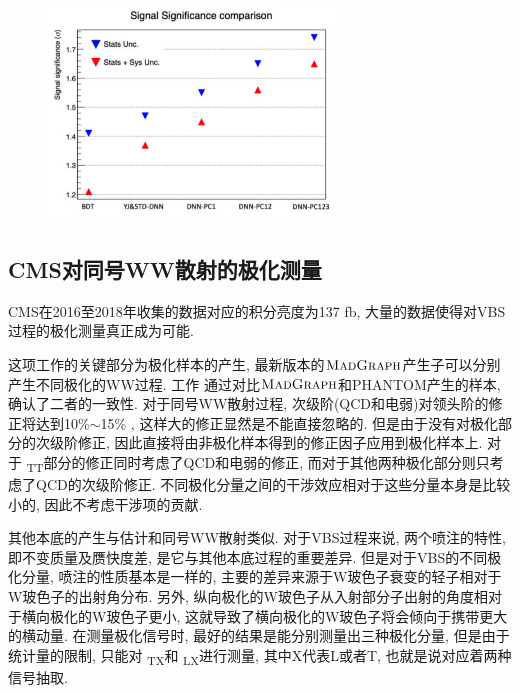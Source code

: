 \documentclass{SCIS2020cn}
\newcommand{\MADGRAPH}{\textsc{MadGraph}\xspace}
\newcommand{\Wboson}{\text{W}}
\begin{document}
\begin{figure}[ht!]
\centering
\includegraphics[width=3in,height=2.25in]{Figure-19.pdf}
\label{fig:19}
\end{figure}

\subsection{CMS对同号WW散射的极化测量}

CMS在2016至2018年收集的数据对应的积分亮度为137 fb, 大量的数据使得对VBS过程的极化测量真正成为可能. 

这项工作的关键部分为极化样本的产生, 最新版本的$\MADGRAPH$产生子可以分别产生不同极化的WW过程. 工作 \cite{55} 通过对比$\MADGRAPH$和PHANTOM产生的样本, 确认了二者的一致性. 对于同号WW散射过程, 次级阶(QCD和电弱)对领头阶的修正将达到10\%$\sim$15\% , 这样大的修正显然是不能直接忽略的. 但是由于没有对极化部分的次级阶修正, 因此直接将由非极化样本得到的修正因子应用到极化样本上. 对于 \Wboson\textsubscript{T}\Wboson\textsubscript{T}部分的修正同时考虑了QCD和电弱的修正, 而对于其他两种极化部分则只考虑了QCD的次级阶修正. 不同极化分量之间的干涉效应相对于这些分量本身是比较小的, 因此不考虑干涉项的贡献. 

其他本底的产生与估计和同号WW散射类似. 对于VBS过程来说, 两个喷注的特性, 即不变质量及赝快度差, 是它与其他本底过程的重要差异. 但是对于VBS的不同极化分量, 喷注的性质基本是一样的, 主要的差异来源于W玻色子衰变的轻子相对于W玻色子的出射角分布. 另外, 纵向极化的W玻色子从入射部分子出射的角度相对于横向极化的W玻色子更小, 这就导致了横向极化的W玻色子将会倾向于携带更大的横动量. 在测量极化信号时, 最好的结果是能分别测量出三种极化分量, 但是由于统计量的限制, 只能对 \Wboson\textsubscript{T}\Wboson\textsubscript{X}和 \Wboson\textsubscript{L}\Wboson\textsubscript{X}进行测量, 其中X代表L或者T, 也就是说对应着两种信号抽取. 
\end{document}
